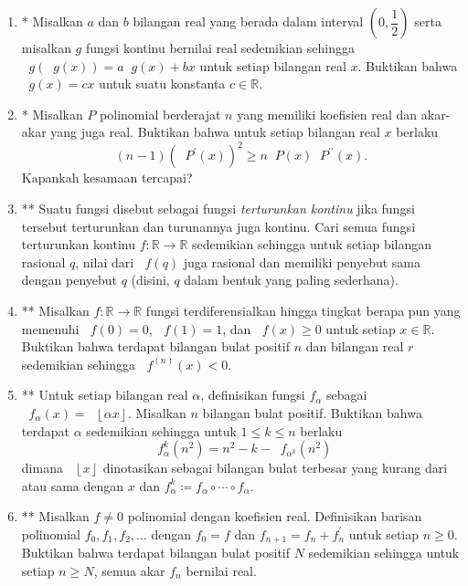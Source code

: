 \documentclass[12pt]{article}
\newcommand*\floor[1]{\mathop{}\!\left\lfloor{#1}\right\rfloor}
\newcommand*\func[2]{\mathop{}\!{#1}{\left({#2}\right)}}
\begin{document}
\begin{enumerate}[leftmargin=*]
		\item* Misalkan $ a $ dan $ b $ bilangan real yang berada dalam interval $ \left(0, \dfrac{1}{2}\right) $ serta misalkan $ g $ fungsi kontinu bernilai real sedemikian sehingga $ \func{g}{\func{g}{x}} = a\func{g}{x} + bx $ untuk setiap bilangan real $ x $. Buktikan bahwa $ \func{g}{x} = cx $ untuk suatu konstanta $ c \in \mathbb{R} $.
		\item* Misalkan $ P $ polinomial berderajat $ n $ yang memiliki koefisien real dan akar-akar yang juga real. Buktikan bahwa untuk setiap bilangan real $ x $ berlaku
		\[ \left(n - 1\right)\left(\func{P^{\prime}}{x}\right)^{2} \geq n\func{P}{x}\func{P^{\prime\prime}}{x}. \]
		Kapankah kesamaan tercapai?
		\item** Suatu fungsi disebut sebagai fungsi \textit{terturunkan kontinu} jika fungsi tersebut terturunkan dan turunannya juga kontinu. Cari semua fungsi terturunkan kontinu $ f : \mathbb{R} \to \mathbb{R} $ sedemikian sehingga untuk setiap bilangan rasional $ q $, nilai dari $ \func{f}{q} $ juga rasional dan memiliki penyebut sama dengan penyebut $ q $ (disini, $ q $ dalam bentuk yang paling sederhana).
		\item** Misalkan $ f : \mathbb{R} \to \mathbb{R} $ fungsi terdiferensialkan hingga tingkat berapa pun yang memenuhi $ \func{f}{0} = 0 $, $ \func{f}{1} = 1 $, dan $ \func{f}{x} \geq 0 $ untuk setiap $ x \in \mathbb{R} $. Buktikan bahwa terdapat bilangan bulat positif $ n $ dan bilangan real $ r $ sedemikian sehingga $ \func{f^{\left(n\right)}}{x} < 0 $.
		\item** Untuk setiap bilangan real $ \alpha $, definisikan fungsi $ f_{\alpha} $ sebagai $ \func{f_{\alpha}}{x} = \floor{\alpha x} $. Misalkan $ n $ bilangan bulat positif. Buktikan bahwa terdapat $ \alpha $ sedemikian sehingga untuk $ 1 \leq k \leq n $ berlaku
		\[ \func{f_{\alpha}^{k}}{n^{2}} = n^{2} - k - \func{f_{\alpha^{k}}}{n^{2}} \]
		dimana $ \floor{x} $ dinotasikan sebagai bilangan bulat terbesar yang kurang dari atau sama dengan $ x $ dan $ f_{\alpha}^{k} \coloneqq f_{\alpha} \circ \cdots \circ f_{\alpha} $.
		\item** Misalkan $ f \ne 0 $ polinomial dengan koefisien real. Definisikan barisan polinomial $ f_{0}, f_{1}, f_{2}, \dots $ dengan $ f_{0} = f $ dan $ f_{n + 1} = f_{n} + f_{n}^{\prime} $ untuk setiap $ n \geq 0 $. Buktikan bahwa terdapat bilangan bulat positif $ N $ sedemikian sehingga untuk setiap $ n \geq N $, semua akar $ f_{n} $ bernilai real.
	\end{enumerate}
\end{document}
